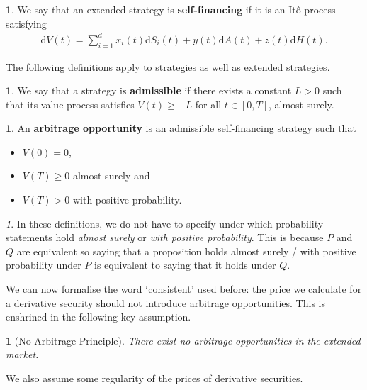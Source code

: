 \documentclass[english]{article}
\numberwithin{equation}{section}
\numberwithin{figure}{section}
\theoremstyle{bolddescit}
\theoremstyle{definition}
\newtheorem{definition}[theorem]{\protect\definitionname}
\theoremstyle{definition}
\theoremstyle{plain}
\theoremstyle{plain}
\theoremstyle{bolddesc}
\newtheorem{assumption}[theorem]{\protect\assumptionname}
\theoremstyle{plain}
\theoremstyle{remark}
\newtheorem{remark}[theorem]{\protect\remarkname}
\providecommand{\assumptionname}{Assumption}
\providecommand{\definitionname}{Definition}
\providecommand{\remarkname}{Remark}
\begin{document}
\begin{definition}
  We say that an extended strategy is \textbf{self-financing} if it is an It\^o process satisfying
  \begin{align*}
    \mathrm{d}V(t) = \sum_{i=1}^d x_i(t) \mathrm{d}S_i(t) + y(t) \mathrm{d}A(t) + z(t) \mathrm{d}H(t).
  \end{align*}
\end{definition}

The following definitions apply to strategies as well as extended strategies.

\begin{definition}
  We say that a strategy is \textbf{admissible} if there exists a constant $L > 0$ such that its value process satisfies $V(t) \ge -L$ for all $t \in [0,T]$, almost surely.
\end{definition}

\begin{definition}
  An \textbf{arbitrage opportunity} is an admissible self-financing strategy such that
  \begin{itemize}
    \item $V(0) = 0$,
    \item $V(T) \ge 0$ almost surely and
    \item $V(T) > 0$ with positive probability.
  \end{itemize}
\end{definition}

\begin{remark}
  In these definitions, we do not have to specify under which probability statements hold \textit{almost surely} or \textit{with positive probability}. This is because $P$ and $Q$ are equivalent so saying that a proposition holds almost surely / with positive probability under $P$ is equivalent to saying that it holds under $Q$.
\end{remark}

We can now formalise the word `consistent' used before: the price we calculate for a derivative security should not introduce arbitrage opportunities. This is enshrined in the following key assumption.

\begin{assumption}[No-Arbitrage Principle]\label{ass:no-arbitrage-principle}
  There exist no arbitrage opportunities in the extended market.
\end{assumption}

We also assume some regularity of the prices of derivative securities.
\end{document}
